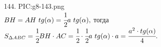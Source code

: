 144. {{PIC:g8-143.png}}\\
$BH=AH\ tg(\alpha)=\cfrac{1}{2}a\ tg(\alpha),$ тогда $S_{\Delta ABC}=\cfrac{1}{2}BH\cdot AC=\cfrac{1}{2}\cdot \cfrac{1}{2}a\ tg(\alpha)\cdot a=\cfrac{a^2\cdot tg(\alpha)}{4}.$\\
